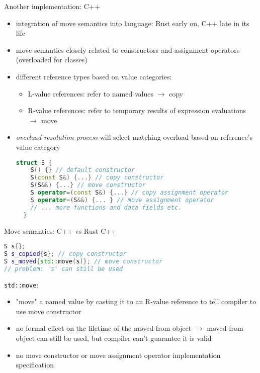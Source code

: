 \documentclass{beamer}
\begin{document}
\begin{frame}[fragile]{Another implementation: C++}
\begin{itemize}
  \item integration of move semantics into language: Rust early on, C++ late in its life
  \item move semantics closely related to constructors and assignment operators (overloaded for classes)
  \item different reference types based on value categories:
  \begin{itemize}
    \item L-value references: refer to named values $\rightarrow$ copy
    \item R-value references: refer to temporary results of expression evaluations $\rightarrow$ move
  \end{itemize}
  \item \emph{overload resolution process} will select matching overload based on reference's value category
  \begin{lstlisting}[language=C++]
  struct S {
    S() {} // default constructor
    S(const S&) {...} // copy constructor
    S(S&&) {...} // move constructor
    S operator=(const S&) {...} // copy assignment operator
    S operator=(S&&) {... } // move assignment operator
    // ... more functions and data fields etc.
  }
  \end{lstlisting}
\end{itemize}
\end{frame}


\begin{frame}[fragile]{Move semantics: C++ vs Rust}
C++
\begin{lstlisting}[language=C++]
S s{};
S s_copied{s}; // copy constructor
S s_moved{std::move(s)}; // move constructor
// problem: 's' can still be used
\end{lstlisting}

\verb|std::move|:
\begin{itemize}
  \item "move" a named value by casting it to an R-value reference to tell compiler to use move constructor
  \item no formal effect on the lifetime of the moved-from object $\rightarrow$ moved-from object can still be used, but compiler can't guarantee it is valid
  \item no move constructor or move assignment operator implementation specification
\end{itemize}
\end{frame}
\end{document}

